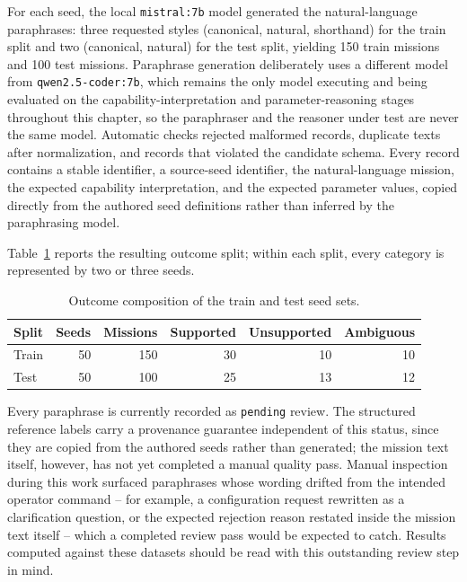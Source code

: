For each seed, the local \texttt{mistral:7b} model \cite{jiang2023mistral} generated the natural-language paraphrases: three requested styles (canonical, natural, shorthand) for the train split and two (canonical, natural) for the test split, yielding 150 train missions and 100 test missions. Paraphrase generation deliberately uses a different model from \texttt{qwen2.5-coder:7b}, which remains the only model executing and being evaluated on the capability-interpretation and parameter-reasoning stages throughout this chapter, so the paraphraser and the reasoner under test are never the same model. Automatic checks rejected malformed records, duplicate texts after normalization, and records that violated the candidate schema. Every record contains a stable identifier, a source-seed identifier, the natural-language mission, the expected capability interpretation, and the expected parameter values, copied directly from the authored seed definitions rather than inferred by the paraphrasing model.

Table~\ref{tab:train-test-composition} reports the resulting outcome split; within each split, every category is represented by two or three seeds.

\begin{table}[H]
\centering
\caption{Outcome composition of the train and test seed sets.}
\label{tab:train-test-composition}
\begin{tabular}{lrrrrr}
\toprule
Split & Seeds & Missions & Supported & Unsupported & Ambiguous \\
\midrule
Train & 50 & 150 & 30 & 10 & 10 \\
Test & 50 & 100 & 25 & 13 & 12 \\
\bottomrule
\end{tabular}
\end{table}

Every paraphrase is currently recorded as \texttt{pending} review. The structured reference labels carry a provenance guarantee independent of this status, since they are copied from the authored seeds rather than generated; the mission text itself, however, has not yet completed a manual quality pass. Manual inspection during this work surfaced paraphrases whose wording drifted from the intended operator command -- for example, a configuration request rewritten as a clarification question, or the expected rejection reason restated inside the mission text itself -- which a completed review pass would be expected to catch. Results computed against these datasets should be read with this outstanding review step in mind.

